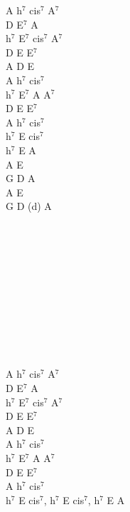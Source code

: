 \documentclass[a5paper, 10pt]{book}
\begin{document}
\begin{minipage}[t]{0.35\textwidth}
  A h$^7$ cis$^7$ A$^7$\\
  D E$^7$ A\\
  h$^7$ E$^7$ cis$^7$ A$^7$\\
  D E E$^7$\\
  A D E\\
  A h$^7$ cis$^7$\\
  h$^7$ E$^7$ A A$^7$\\
  D E E$^7$\\
  A h$^7$ cis$^7$\\
  h$^7$ E cis$^7$ \\
  h$^7$ E A\\

  A E \\
  G D A\\
  A E \\
  G D (d) A\\

  ~\\
  ~\\
  ~\\
  ~\\
  ~\\
  ~\\
  ~\\
  ~\\
  ~\\
  ~\\
  ~\\

  A h$^7$ cis$^7$ A$^7$\\
  D E$^7$ A\\
  h$^7$ E$^7$ cis$^7$ A$^7$\\
  D E E$^7$\\
  A D E\\
  A h$^7$ cis$^7$\\
  h$^7$ E$^7$ A A$^7$\\
  D E E$^7$\\
  A h$^7$ cis$^7$\\
  h$^7$ E cis$^7$, h$^7$ E cis$^7$, h$^7$ E A\\
\end{minipage}

\newpage
\end{document}
